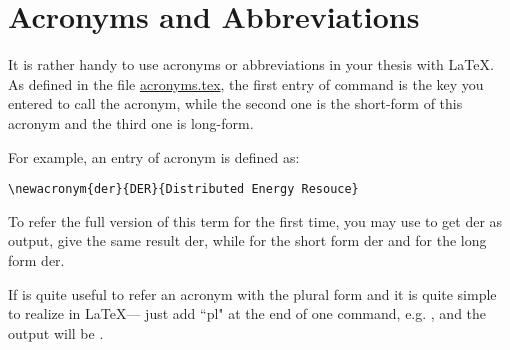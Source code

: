 \chapter{Acronyms and Abbreviations}

\graphicspath{ {graphics/Chapter6/} }

It is rather handy to use acronyms or abbreviations in your thesis with \LaTeX. As defined in the file \href{acronyms/acronyms.tex}{acronyms.tex}, the first entry of {\color{blue}{\verb|\newacronym|}} command is the key you entered to call the acronym, while the second one is the short-form of this acronym and the third one is long-form.

For example, an entry of acronym is defined as:

{\verb|\newacronym{der}{DER}{Distributed Energy Resouce}|}

To refer the full version of this term for the first time, you may use {} to get \gls{der} as output, {} give the same result \acrfull{der}, while {} for the short form \acrshort{der} and {} for the long form \acrlong{der}.

If is quite useful to refer an acronym with the plural form and it is quite simple to realize in \LaTeX --- just add ``pl" at the end of one command, e.g. {}, and the output will be .